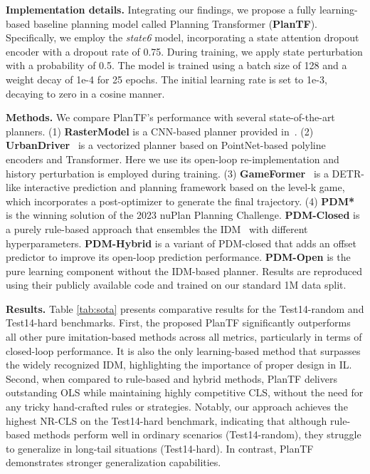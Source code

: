 \documentclass[letterpaper, 10 pt, conference]{ieeeconf}  %
\renewcommand{\paragraph}[1]{\vspace{1.25mm}\noindent\textbf{#1}}
\begin{document}
\paragraph{Implementation details.} 
Integrating our findings, we propose a fully learning-based baseline planning model called Planning Transformer (\textbf{PlanTF}). Specifically, we employ the \textit{state6} model, incorporating a state attention dropout encoder with a dropout rate of 0.75. During training, we apply state perturbation with a probability of 0.5. The model is trained using a batch size of 128 and a weight decay of 1e-4 for 25 epochs. The initial learning rate is set to 1e-3, decaying to zero in a cosine manner.

\paragraph{Methods.}
We compare PlanTF's performance with several state-of-the-art planners. 
(1) \textbf{RasterModel} is a CNN-based planner provided in~\cite{caesar2021nuplan}. 
(2) \textbf{UrbanDriver}~\cite{scheel2022urban} is a vectorized planner based on PointNet-based polyline encoders and Transformer. Here we use its open-loop re-implementation and history perturbation is employed during training. 
(3) \textbf{GameFormer}~\cite{huang2023gameformer} is a DETR-like interactive prediction and planning framework based on the level-k game, which incorporates a post-optimizer to generate the final trajectory.
(4) \textbf{PDM*}~\cite{Dauner2023CORL} is the winning solution of the 2023 nuPlan Planning Challenge. \textbf{PDM-Closed} is a purely rule-based approach that ensembles the IDM~\cite{treiber2000idm} with different hyperparameters. \textbf{PDM-Hybrid} is a variant of PDM-closed that adds an offset predictor to improve its open-loop prediction performance. \textbf{PDM-Open} is the pure learning component without the IDM-based planner. Results are reproduced using their publicly available code and trained on our standard 1M data split.

\paragraph{Results.}
Table \ref{tab:sota} presents comparative results for the Test14-random and Test14-hard benchmarks. First, the proposed PlanTF significantly outperforms all other pure imitation-based methods across all metrics, particularly in terms of closed-loop performance. It is also the only learning-based method that surpasses the widely recognized IDM, highlighting the importance of proper design in IL. Second, when compared to rule-based and hybrid methods, PlanTF delivers outstanding OLS while maintaining highly competitive CLS, without the need for any tricky hand-crafted rules or strategies. Notably, our approach achieves the highest NR-CLS on the Test14-hard benchmark, indicating that although rule-based methods perform well in ordinary scenarios (Test14-random), they struggle to generalize in long-tail situations (Test14-hard). In contrast, PlanTF demonstrates stronger generalization capabilities. 
\end{document}
